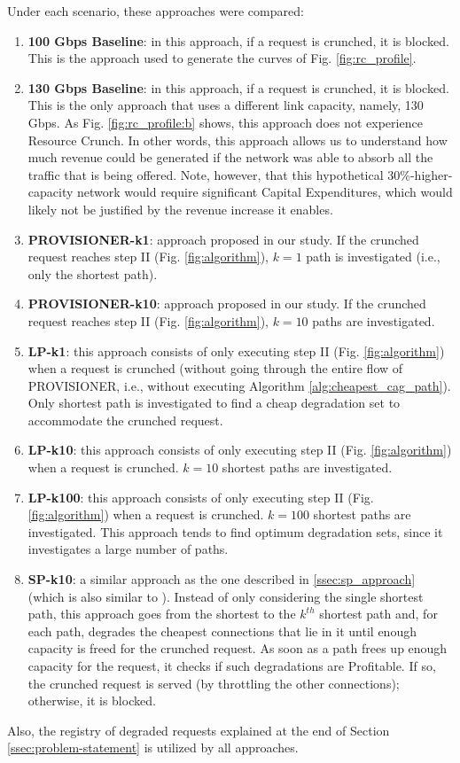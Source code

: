 \documentclass[journal]{IEEEtran}
\begin{document}
Under each scenario, these approaches were compared:
\begin{enumerate}
\item \textbf{100 Gbps Baseline}: in this approach, if a request is crunched, it is blocked. This is the approach used to generate the curves of Fig. \ref{fig:rc_profile}.
\item \textbf{130 Gbps Baseline}: in this approach, if a request is crunched, it is blocked. This is the only approach that uses a different link capacity, namely, 130 Gbps. As Fig. \ref{fig:rc_profile:b} shows, this approach does not experience Resource Crunch. In other words, this approach allows us to understand how much revenue could be generated if the network was able to absorb all the traffic that is being offered. Note, however, that this hypothetical 30\%-higher-capacity network would require significant Capital Expenditures, which would likely not be justified by the revenue increase it enables.
\item \textbf{PROVISIONER-k1}: approach proposed in our study. If the crunched request reaches step II (Fig. \ref{fig:algorithm}), $k=1$ path is investigated (i.e., only the shortest path).
\item \textbf{PROVISIONER-k10}: approach proposed in our study. If the crunched request reaches step II (Fig. \ref{fig:algorithm}), $k=10$ paths are investigated.
\item \textbf{LP-k1}: this approach consists of only executing step II (Fig. \ref{fig:algorithm}) when a request is crunched (without going through the entire flow of PROVISIONER, i.e., without executing Algorithm \ref{alg:cheapest_cag_path}). Only shortest path is investigated to find a cheap degradation set to accommodate the crunched request.
\item \textbf{LP-k10}: this approach consists of only executing step II (Fig. \ref{fig:algorithm}) when a request is crunched. $k=10$ shortest paths are investigated.
\item \textbf{LP-k100}: this approach consists of only executing step II (Fig. \ref{fig:algorithm}) when a request is crunched. $k=100$ shortest paths are investigated. This approach tends to find optimum degradation sets, since it investigates a large number of paths.
\item \textbf{SP-k10}: a similar approach as the one described in \ref{ssec:sp_approach} (which is also similar to \cite{savas2016backup, 7842043, roy2014network}). Instead of only considering the single shortest path, this approach goes from the shortest to the $k^{th}$ shortest path and, for each path, degrades the cheapest connections that lie in it until enough capacity is freed for the crunched request. As soon as a path frees up enough capacity for the request, it checks if such degradations are Profitable. If so, the crunched request is served (by throttling the other connections); otherwise, it is blocked.
\end{enumerate}
Also, the registry of degraded requests explained at the end of Section \ref{ssec:problem-statement} is utilized by all approaches.
\end{document}
